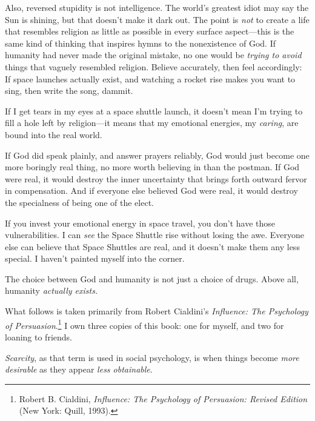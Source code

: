 {
 Also, reversed stupidity is not intelligence. The
world's greatest idiot may say the Sun is shining, but
that doesn't make it dark out. The point is
\textit{not} to create a life that resembles religion as little as
possible in every surface aspect---this is the same kind of thinking
that inspires hymns to the nonexistence of God. If humanity had never
made the original mistake, no one would be \textit{trying to avoid}
things that vaguely resembled religion. Believe accurately, then feel
accordingly: If space launches actually exist, and watching a rocket
rise makes you want to sing, then write the song, dammit.}

{
 If I get tears in my eyes at a space shuttle launch, it
doesn't mean I'm trying to fill a hole
left by religion---it means that my emotional energies, my
\textit{caring}, are bound into the real world.}

{
 If God did speak plainly, and answer prayers reliably, God would
just become one more boringly real thing, no more worth believing in
than the postman. If God were real, it would destroy the inner
uncertainty that brings forth outward fervor in compensation. And if
everyone else believed God were real, it would destroy the specialness
of being one of the elect.}

{
 If you invest your emotional energy in space travel, you
don't have those vulnerabilities. I can \textit{see}
the Space Shuttle rise without losing the awe. Everyone else can
believe that Space Shuttles are real, and it doesn't
make them any less special. I haven't painted myself
into the corner.}

{
 The choice between God and humanity is not just a choice of drugs.
Above all, humanity \textit{actually exists.}}

\myendsectiontext


{
 What follows is taken primarily from Robert
Cialdini's \textit{Influence: The Psychology of
Persuasion}.\footnote{Robert B. Cialdini, \textit{Influence: The Psychology of
Persuasion: Revised Edition} (New York: Quill, 1993).} I own three copies of this book: one
for myself, and two for loaning to friends. }

{
 \textit{Scarcity}, as that term is used in social psychology, is
when things become \textit{more desirable} as they appear \textit{less
obtainable}.}

